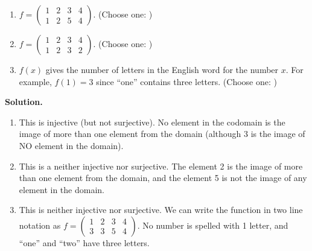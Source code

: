 \documentclass[10pt,]{book}
\theoremstyle{plain}
\theoremstyle{definition}
\theoremstyle{definition}
\numberwithin{equation}{chapter}
\newcommand{\twoline}[2]{\begin{pmatrix}#1 \\ #2 \end{pmatrix}}
\newcommand{\amp}{&}
\begin{document}
\begin{exerciselist}
\par
\hypertarget{p-667}{}%
\leavevmode%
\begin{enumerate}[label=(\alph*)]
\item\hypertarget{li-425}{}\hypertarget{p-668}{}%
\(f = \twoline{1 \amp 2 \amp 3 \amp 4}{1 \amp 2 \amp 5 \amp 4}\). (Choose one: )%
\item\hypertarget{li-426}{}\hypertarget{p-669}{}%
\(f = \twoline{1 \amp 2 \amp 3 \amp 4}{1 \amp 2 \amp 3 \amp 2}\). (Choose one: )%
\item\hypertarget{li-427}{}\hypertarget{p-670}{}%
\(f(x)\) gives the number of letters in the English word for the number \(x\).  For example, \(f(1) = 3\) since ``one'' contains three letters. (Choose one: )%
\end{enumerate}
%
\par
\medskip\noindent%
\textbf{Solution.}\quad \hypertarget{p-671}{}%
\leavevmode%
\begin{enumerate}[label=(\alph*)]
\item\hypertarget{li-428}{}\hypertarget{p-672}{}%
This is injective (but not surjective).  No element in the codomain is the image of more than one element from the domain (although 3 is the image of NO element in the domain).%
\item\hypertarget{li-429}{}\hypertarget{p-673}{}%
This is a neither injective nor surjective.  The element 2 is the image of more than one element from the domain, and the element 5 is not the image of any element in the domain.%
\item\hypertarget{li-430}{}\hypertarget{p-674}{}%
This is neither injective nor surjective.  We can write the function in two line notation as \(f = \twoline{1 \amp 2 \amp 3 \amp 4}{3 \amp 3 \amp 5 \amp 4}\).  No number is spelled with 1 letter, and ``one'' and ``two'' have three letters.%
\end{enumerate}
%
\par
\end{exerciselist}
\typeout{************************************************}
\typeout{************************************************}
\end{document}
